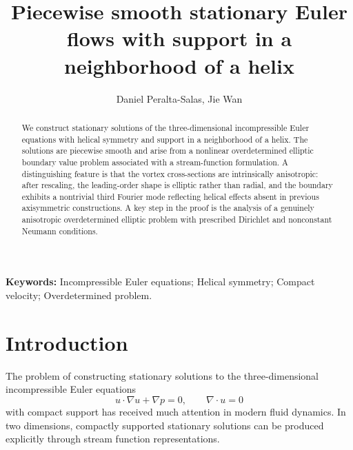 \documentclass[12pt,reqno]{amsart}
\numberwithin{equation}{section}
\theoremstyle{definition}
\theoremstyle{remark}
\begin{document}
		
	\title[Helical stationary states of Euler]{Piecewise smooth stationary  Euler flows with support in a neighborhood of a helix} 
	
	\author{Daniel Peralta-Salas, Jie Wan}
	 
	
	\address{Instituto de Ciencias Matem\'aticas, 
		Consejo Superior de Investigaciones Cient\'{\i}ficas, 
		Madrid, Spain}

	\address{School of Mathematics and Statistics, Beijing Institute of Technology, Beijing,  P.R. China}

\maketitle

\begin{abstract}
We construct stationary solutions of the three-dimensional incompressible Euler equations with helical symmetry and support in a neighborhood of a helix. The solutions are piecewise smooth and arise from a nonlinear overdetermined elliptic boundary value problem associated with a stream-function formulation. A distinguishing feature is that the vortex cross-sections are intrinsically anisotropic: after rescaling, the leading-order shape is elliptic rather than radial, and the boundary exhibits a nontrivial third Fourier mode reflecting helical effects absent in previous axisymmetric constructions. A key step in the proof is the analysis of a genuinely anisotropic overdetermined elliptic problem with prescribed Dirichlet and nonconstant Neumann conditions.  
	
\end{abstract}
\maketitle \small{\bf Keywords:} Incompressible Euler equations; Helical symmetry; Compact velocity; Overdetermined problem.   \\		 

\tableofcontents

\section{Introduction}

 

The problem of constructing stationary solutions to the three-dimensional incompressible Euler
equations 
\begin{equation}\label{eq:euler}
u\cdot \nabla u+\nabla p=0,\qquad \nabla\cdot u=0
\end{equation}
with compact support has received much attention in modern fluid dynamics.  In two  dimensions, compactly supported stationary solutions can be produced explicitly through stream function representations.
\end{document}

